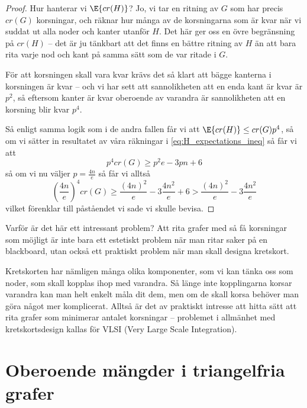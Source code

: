 \documentclass[nobib]{tufte-handout}
\begin{document}
\begin{theorem}
\begin{proof}
    Hur hanterar vi $\E{cr(H)}$? Jo, vi tar en ritning av $G$ som har precis $cr(G)$ korsningar, och räknar hur många av de korsningarna som är kvar när vi suddat ut alla noder och kanter utanför $H$. Det här ger oss en övre begränsning på $cr(H)$ -- det är ju tänkbart att det finns en bättre ritning av $H$ än att bara rita varje nod och kant på samma sätt som de var ritade i $G$.

    För att korsningen skall vara kvar krävs det så klart att bägge kanterna i korsningen är kvar -- och vi har sett att sannolikheten att en enda kant är kvar är $p^2$, så eftersom kanter är kvar oberoende av varandra är sannolikheten att en korsning blir kvar $p^4$.

    Så enligt samma logik som i de andra fallen får vi att $\E{cr(H)} \leq cr(G)p^4$, så om vi sätter in resultatet av våra räkningar i \eqref{eq:H_expectations_ineq} så får vi att
    $$p^4cr(G) \geq p^2e - 3pn + 6$$
    så om vi nu väljer $p = \frac{4n}{e}$ så får vi alltså
    $$\left(\frac{4n}{e}\right)^4 cr(G) \geq \frac{(4n)^2}{e} - 3\frac{4n^2}{e} + 6 > \frac{(4n)^2}{e} - 3\frac{4n^2}{e}$$
    vilket förenklar till påståendet vi sade vi skulle bevisa.
  \end{proof}
\end{theorem}

Varför är det här ett intressant problem? Att rita grafer med så få korsningar som möjligt är inte bara ett estetiskt problem när man ritar saker på en blackboard, utan också ett praktiskt problem när man skall designa kretskort.

Kretskorten har nämligen många olika komponenter, som vi kan tänka oss som noder, som skall kopplas ihop med varandra. Så länge inte kopplingarna korsar varandra kan man helt enkelt måla dit dem, men om de skall korsa behöver man göra något mer komplicerat. Alltså är det av praktiskt intresse att hitta sätt att rita grafer som minimerar antalet korsningar -- problemet i allmänhet med kretskortsdesign kallas för VLSI (Very Large Scale Integration).

\section{Oberoende mängder i triangelfria grafer}
\end{document}
